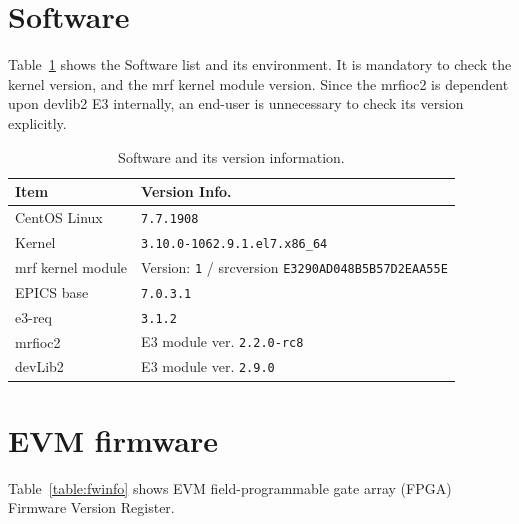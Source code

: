 \documentclass[11pt
  , a4paper
  , article
  , oneside
  , showtrims
]{memoir}
\begin{document}
\section{Software}
Table~\ref{table:swlist} shows the Software list and its environment. It is mandatory to check the kernel version, and the mrf kernel module version. Since the mrfioc2 is dependent upon devlib2 E3 internally, an end-user is unnecessary to check its version explicitly.
\begin{table}[!htb]
  \centering
  \begin{tabular}{l|l}
    \toprule
    Item               & Version Info.                                                      \\\midrule
    CentOS Linux       & \texttt{7.7.1908}                                                  \\\midrule
    Kernel             & \texttt{3.10.0-1062.9.1.el7.x86\_64}                               \\\midrule
    mrf kernel module  & Version: \texttt{1} / srcversion \texttt{E3290AD048B5B57D2EAA55E}  \\\midrule
    EPICS base         & \texttt{7.0.3.1}                                                   \\\midrule
    e3-req             & \texttt{3.1.2}                                                     \\\midrule
    mrfioc2            & E3 module ver. \texttt{2.2.0-rc8}                                  \\\midrule
    devLib2            & E3 module ver. \texttt{2.9.0}                                      \\\bottomrule
  \end{tabular}
  \caption[]{Software and its version information.}
  \label{table:swlist}
\end{table}

\section{EVM firmware}
Table~\ref{table:fwinfo} shows EVM field-programmable gate array (FPGA) Firmware Version Register.
\end{document}
